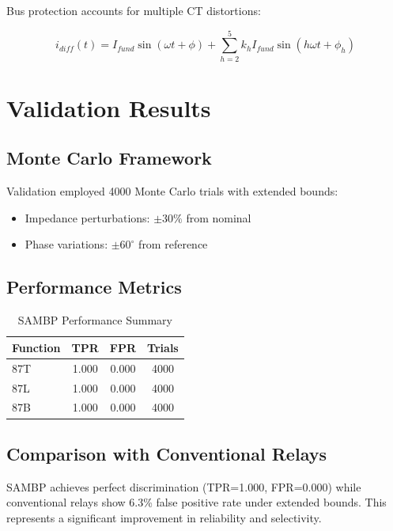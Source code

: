 \documentclass[10pt]{article}
\begin{document}
Bus protection accounts for multiple CT distortions:

\begin{equation}
i_{diff}(t) = I_{fund} \sin(\omega t + \phi) + \sum_{h=2}^5 k_h I_{fund} \sin(h\omega t + \phi_h)
\label{eq:87b}
\end{equation}

\section{Validation Results}
\label{sec:results}

\subsection{Monte Carlo Framework}

Validation employed 4000 Monte Carlo trials with extended bounds:
\begin{itemize}
\item Impedance perturbations: $\pm 30\%$ from nominal
\item Phase variations: $\pm 60^{\circ}$ from reference
\end{itemize}

\subsection{Performance Metrics}

\begin{table}[!t]
\caption{SAMBP Performance Summary}
\label{tab:performance}
\centering
\begin{tabular}{@{}lccc@{}}
\toprule
Function & TPR & FPR & Trials \\
\midrule
87T & 1.000 & 0.000 & 4000 \\
87L & 1.000 & 0.000 & 4000 \\
87B & 1.000 & 0.000 & 4000 \\
\bottomrule
\end{tabular}
\end{table}

\subsection{Comparison with Conventional Relays}

SAMBP achieves perfect discrimination (TPR=1.000, FPR=0.000) while conventional relays show 6.3\% false positive rate under extended bounds. This represents a significant improvement in reliability and selectivity.
\end{document}
